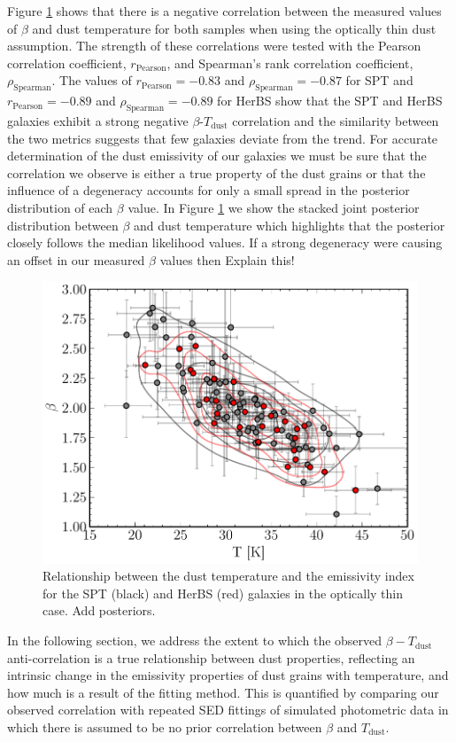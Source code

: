 Figure \ref{fig:beta_t_correlation} shows that there is a negative correlation between the measured values of $\beta$ and dust temperature for both samples when using the optically thin dust assumption. The strength of these correlations were tested with the Pearson correlation coefficient, $r_{\textrm{Pearson}}$, and Spearman's rank correlation coefficient, $\rho_{\textrm{Spearman}}$. The values of $r_{\textrm{Pearson}} = -0.83$ and $\rho_{\textrm{Spearman}} = -0.87$ for SPT and $r_{\textrm{Pearson}} = -0.89$ and $\rho_{\textrm{Spearman}} = -0.89$ for HerBS show that the SPT and HerBS galaxies exhibit a strong negative $\beta$-$T_{\textrm{dust}}$ correlation and the similarity between the two metrics suggests that few galaxies deviate from the trend. For accurate determination of the dust emissivity of our galaxies we must be sure that the correlation we observe is either a true property of the dust grains or that the influence of a degeneracy accounts for only a small spread in the posterior distribution of each $\beta$ value. In Figure \ref{fig:beta_t_correlation} we show the stacked joint posterior distribution between $\beta$ and dust temperature which highlights that the posterior closely follows the median likelihood values. If a strong degeneracy were causing an offset in our measured $\beta$ values then {\color{red} Explain this!}

\begin{figure}
	\centering
	\includegraphics[width=0.75\columnwidth]{Figures/beta_t_correlation.pdf}
	\caption{Relationship between the dust temperature and the emissivity index for the SPT (black) and HerBS (red) galaxies in the optically thin case. {\color{red} Add posteriors.}}
	\label{fig:beta_t_correlation}
\end{figure}

In the following section, we address the extent to which the observed $\beta-T_{\textrm{dust}}$ anti-correlation is a true relationship between dust properties, reflecting an intrinsic change in the emissivity properties of dust grains with temperature, and how much is a result of the fitting method. This is quantified by comparing our observed correlation with repeated SED fittings of simulated photometric data in which there is assumed to be no prior correlation between $\beta$ and $T_{\textrm{dust}}$.

